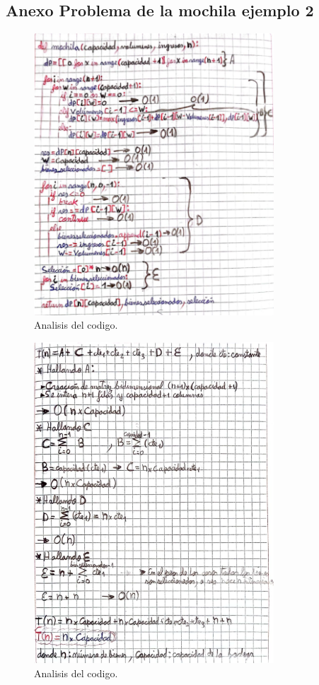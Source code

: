 \subsection{Anexo Problema de la mochila ejemplo 2}
\begin{figure}[H]
	\centering
	\includegraphics[width=0.8\textwidth]{complejidad_mochila_ejem2.png}
	\caption{Analisis del codigo.}
	\label{fig:complejidad1}
\end{figure}

\begin{figure}[H]
	\centering
	\includegraphics[width=0.8\textwidth]{complejidad_mochila_ejem2_2.png}
	\caption{Analisis del codigo.}
	\label{fig:complejidad1}
\end{figure}

